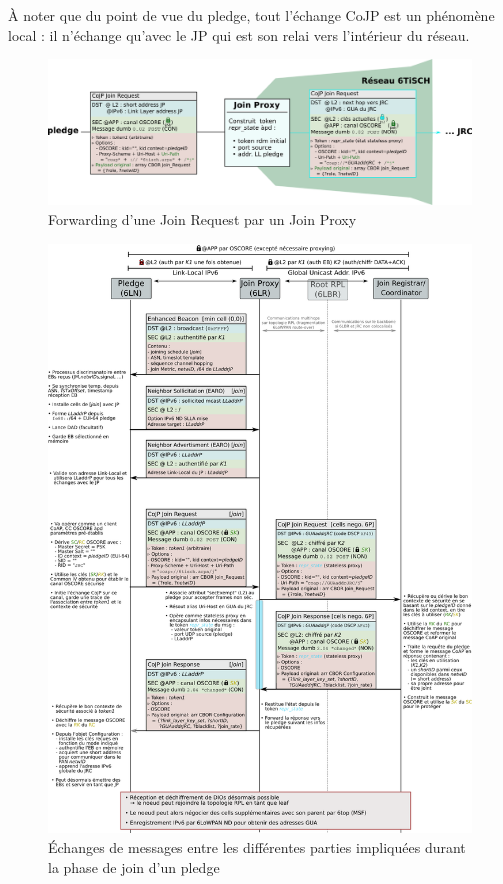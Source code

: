 \documentclass[]{report}
\begin{document}
À noter que du point de vue du pledge, tout l'échange CoJP est un phénomène local : il n'échange qu'avec le JP qui est son relai vers l'intérieur du réseau.

\vspace{0.2cm}
	\begin{figure}[!h]
	\centering
	\includegraphics[width=\linewidth]{Join_Request}
	\caption{Forwarding d'une Join Request par un Join Proxy}
	\label{fig:join_request}
	\end{figure}

\newpage

	\begin{figure}[!h]
	\centering
	\includegraphics[width=\linewidth]{joining_phase}
	\caption{Échanges de messages entre les différentes parties impliquées durant la phase de join d'un pledge}
	\label{fig:joining_phase}
	\end{figure}
\end{document}
